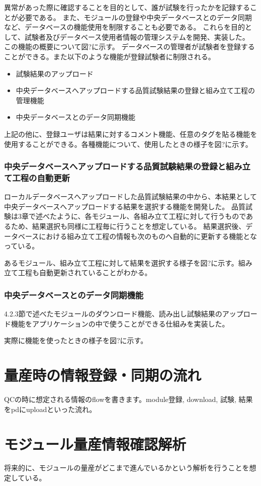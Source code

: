 異常があった際に確認することを目的として、誰が試験を行ったかを記録することが必要である。
また、モジュールの登録や中央データベースとのデータ同期など、データベースの機能使用を制限することも必要である。
これらを目的として、試験者及びデータベース使用者情報の管理システムを開発、実装した。
この機能の概要について図?に示す。
データベースの管理者が試験者を登録することができる。また以下のような機能が登録試験者に制限される。

\begin{itemize}
  \item 試験結果のアップロード
  \item 中央データベースへアップロードする品質試験結果の登録と組み立て工程の管理機能
  \item 中央データベースとのデータ同期機能
\end{itemize}

上記の他に、登録ユーザは結果に対するコメント機能、任意のタグを貼る機能を使用することができる。各種機能について、使用したときの様子を図?に示す。

\subsubsection{中央データベースへアップロードする品質試験結果の登録と組み立て工程の自動更新}
ローカルデータベースへアップロードした品質試験結果の中から、本結果として中央データベースへアップロードする結果を選択する機能を開発した。
品質試験は3章で述べたように、各モジュール、各組み立て工程に対して行うものであるため、結果選択も同様に工程毎に行うことを想定している。
結果選択後、データベースにおける組み立て工程の情報も次のものへ自動的に更新する機能となっている。

あるモジュール、組み立て工程に対して結果を選択する様子を図?に示す。組み立て工程も自動更新されていることがわかる。

\subsubsection{中央データベースとのデータ同期機能}
4.2.3節で述べたモジュールのダウンロード機能、読み出し試験結果のアップロード機能をアプリケーションの中で使うことができる仕組みを実装した。

実際に機能を使ったときの様子を図?に示す。


\section{量産時の情報登録・同期の流れ}
QCの時に想定される情報のflowを書きます。module登録, download, 試験, 結果をpdにuploadといった流れ。

\section{モジュール量産情報確認解析}
将来的に、モジュールの量産がどこまで進んでいるかという解析を行うことを想定している。

